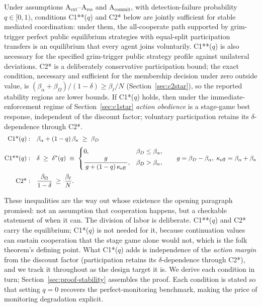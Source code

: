 \documentclass[manuscript,screen,review]{jair}
\begin{document}
\begin{theorem}
\label{thm:stability}
Under assumptions A$_{\mathrm{ext}}$--A$_{\mathrm{res}}$ and A$_{\mathrm{commit}}$, with detection-failure probability $q \in [0,1)$, conditions C1**($q$) and C2* below are jointly sufficient for stable mediated coordination: under them, the all-cooperate path supported by grim-trigger perfect public equilibrium strategies with equal-split participation transfers is an equilibrium that every agent joins voluntarily. C1**($q$) is also necessary for the specified grim-trigger public strategy profile against unilateral deviations. C2* is a deliberately conservative participation bound; the exact condition, necessary and sufficient for the membership decision under zero outside value, is $(\beta_\alpha + \beta_\Omega)/(1-\delta) \geq \beta_\ell/N$ (Section~\ref{sec:c2star}), so the reported stability regions are lower bounds. If C1*($q$) holds, then under the immediate-enforcement regime of Section~\ref{sec:c1star} \emph{action obedience} is a stage-game best response, independent of the discount factor; voluntary participation retains its $\delta$-dependence through C2*.
\begin{align}
\textnormal{C1*}(q):&\quad \beta_\alpha + (1-q)\,\beta_\kappa \;\geq\; \beta_D
\label{eq:c1star}\\[2pt]
\textnormal{C1**}(q):&\quad \delta \;\geq\; \delta^*(q) \;\equiv\;
\begin{cases} 0, & \beta_D \leq \beta_\alpha, \\[2pt] \dfrac{g}{\,g + (1-q)\,\kappa_{\mathrm{eff}}\,}, & \beta_D > \beta_\alpha, \end{cases}
\qquad g = \beta_D - \beta_\alpha,\; \kappa_{\mathrm{eff}} = \beta_\alpha + \beta_\kappa
\label{eq:c1starstar}\\[2pt]
\textnormal{C2*}:&\quad \frac{\beta_\Omega}{1-\delta} \;\geq\; \frac{\beta_\ell}{N}.
\label{eq:c2star}
\end{align}
\end{theorem}

These inequalities are the way out whose existence the opening paragraph promised: not an assumption that cooperation happens, but a checkable statement of when it can. The division of labor is deliberate. C1**($q$) and C2* carry the equilibrium; C1*($q$) is not needed for it, because continuation values can sustain cooperation that the stage game alone would not, which is the folk theorem's defining point. What C1*($q$) adds is independence of the \emph{action margin} from the discount factor (participation retains its $\delta$-dependence through C2*), and we track it throughout as the design target it is. We derive each condition in turn; Section~\ref{sec:proof-stability} assembles the proof. Each condition is stated so that setting $q=0$ recovers the perfect-monitoring benchmark, making the price of monitoring degradation explicit.
\end{document}

